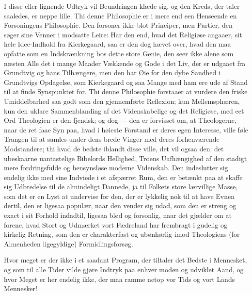 I disse eller lignende Udtryk vil Beundringen klæde sig, og den Kreds, der
taler saaledes, er neppe lille. Thi denne Philosophie er i mere end een
Henseende en Forsoningens Philosophie. Den forsoner
ikke blot Principer, men Partier, den søger sine Venner i modsatte
Leire: Har den end, hvad det Religiøse angaaer, sit hele Idee-Indhold fra
Kierkegaard, saa er den dog hævet over, hvad den maa opfatte som en
Indskrænkning bos dette store Genie, den seer
ikke alene som næsten Alle det i mange Maader Vækkende og Gode i det Liv, der
er udgaaet fra Grundtvig og hans Tilhængere, men den har Øie for den dybe
Sandhed i Grundtvigs Opdagelse, som Kierkegaard og saa Mange med ham ere ude
af Stand til at finde Synspunktet for. Thi denne Philosophie forstaaer at
vurdere den friske Umiddelbarhed saa godt som den gjennemførte Reflexion; kun
Mellemsphæren, kun den uklare Sammenblanding af det Videnskabelige og det
Religiøse, med eet Ord Theologien er den fjendsk; og dog --- den er forvisset
om, at Theologerne, naar de ret faae Syn paa, hvad i høieste Forstand er
deres egen Interesse, ville føle Trangen til at samles under dens brede
Vinger med deres forhenværende Modstandere; thi hvad de bedste iblandt disse
ville, det vil ogsaa den: det ubeskaarne uantastelige Bibelords Hellighed,
Troens Uafhængighed af den stadigt mere fordringsfulde og hensynsløse moderne
Videnskab. Den indeslutter sig endelig ikke med sine Indviede i et afspærret
Rum, den er betænkt paa at skaffe sig Udbredelse til de almindeligt Dannede,
ja til Folkets store lærvillige Masse, som det er en Lyst at undervise for
den, der er lykkelig nok til at have Evnen dertil, den er ligesaa populær,
naar den vender sig udad, som den er streng og exact i sit Forhold
indadtil, ligesaa blød og forsonlig, naar det gjælder om at forene, hvad
Stort og Udmærket vort Fædreland har frembragt i gudelig og kirkelig
Retning, som den er charakterfast og ubønhørlig imod
Theologiens (for Almenheden ligegyldige) Formidlingsforsøg.

Hvor meget er der ikke i et saadant Program, der tiltaler det Bedste i
Mennesket, og som til alle Tider vilde gjøre Indtryk paa enhver moden og
udviklet Aand, og hvor Meget er her endelig ikke, der maa ramme netop vor
Tids og vort Lands Mennesker!

